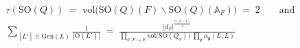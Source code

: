 \documentclass[border=8pt,varwidth=40cm]{standalone}
\begin{document}
\(\displaystyle
\begin{gathered}
\tau(\mathrm{SO}(Q)) \;=\; \mathrm{vol}\bigl(\mathrm{SO}(Q)(F)\backslash \mathrm{SO}(Q)(\mathbb{A}_F)\bigr) \;=\; 2
\qquad\text{and}\\[2ex]
\sum_{[L'] \in \mathrm{Gen}(L)} \frac{1}{|\mathrm{O}(L')|}
\;=\;
\frac{|d_F|^{\frac{n(n-1)}{4}}}{\displaystyle\prod_{\sigma\colon F\hookrightarrow\mathbb{R}} \mathrm{vol}\bigl(\mathrm{SO}(Q_\sigma)\bigr)\;\prod_{\mathfrak{p}} \alpha_{\mathfrak{p}}(L, L)}
\end{gathered}
\)
\end{document}
